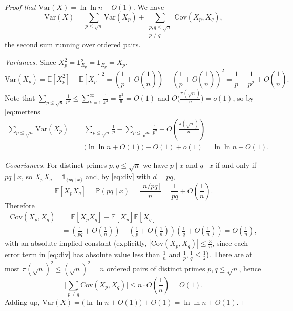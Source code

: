 \documentclass[a4paper,12pt]{article}
\newcommand{\card}[1]{\left| #1 \right|}
\newcommand{\mb}[1]{\mathbb{#1}}
\begin{document}
\begin{proof}[Proof that $\mathrm{Var}(X) = \ln \ln n + O(1)$]
	We have
	\[
		\mathrm{Var}(X) = \sum_{p \le \sqrt n} \mathrm{Var}(X_p) + \sum_{\substack{p, q \le \sqrt n \\ p \neq q}} \mathrm{Cov}(X_p, X_q),
	\]
	the second sum running over ordered pairs.

	\emph{Variances.} Since $X_p^2 = \mathbf 1_{E_p}^2 = \mathbf 1_{E_p} = X_p$,
	\[
		\mathrm{Var}(X_p) = \mb E[X_p^2] - \mb E[X_p]^2 = \left( \frac 1p + O\left( \frac1n \right) \right) - \left( \frac 1p + O\left( \frac1n \right) \right)^2 = \frac 1p - \frac{1}{p^2} + O\left( \frac 1n \right).
	\]
	Note that $\sum_{p \le \sqrt n} \frac{1}{p^2} \le \sum_{k=1}^\infty \frac{1}{k^2} = \frac{\pi^2}{6} = O(1)$ and $O\big( \frac{\pi(\sqrt n)}{n} \big) = o(1)$, so by \eqref{eq:mertens}
	\[
		\begin{aligned}
			\sum_{p \le \sqrt n} \mathrm{Var}(X_p) &= \sum_{p \le \sqrt n} \frac 1p - \sum_{p \le \sqrt n} \frac{1}{p^2} + O\left( \frac{\pi(\sqrt n)}{n} \right) \\
			&= \big( \ln \ln n + O(1) \big) - O(1) + o(1) = \ln \ln n + O(1).
		\end{aligned}
	\]

	\emph{Covariances.} For distinct primes $p, q \le \sqrt n$ we have $p \mid x$ and $q \mid x$ if and only if $pq \mid x$, so $X_p X_q = \mathbf 1_{\{pq \mid x\}}$ and, by \eqref{eq:div} with $d = pq$,
	\[
		\mb E[X_p X_q] = \mb P(pq \mid x) = \frac{\lfloor n/pq \rfloor}{n} = \frac{1}{pq} + O\left( \frac 1n \right).
	\]
	Therefore
	\[
		\begin{aligned}
			\mathrm{Cov}(X_p, X_q) &= \mb E[X_p X_q] - \mb E[X_p] \mb E[X_q] \\
			&= \left( \frac{1}{pq} + O\left( \frac1n \right) \right) - \left( \frac1p + O\left( \frac1n \right) \right) \left( \frac1q + O\left( \frac1n \right) \right) = O\left( \frac1n \right),
		\end{aligned}
	\]
	with an absolute implied constant (explicitly, $\card{\mathrm{Cov}(X_p, X_q)} \le \frac3n$, since each error term in \eqref{eq:div} has absolute value less than $\frac1n$ and $\frac1p, \frac1q \le \frac12$). There are at most $\pi(\sqrt n)^2 \le (\sqrt n)^2 = n$ ordered pairs of distinct primes $p, q \le \sqrt n$, hence
	\[
		\Big| \sum_{p \neq q} \mathrm{Cov}(X_p, X_q) \Big| \le n \cdot O\left( \frac 1n \right) = O(1).
	\]
	Adding up, $\mathrm{Var}(X) = \big( \ln \ln n + O(1) \big) + O(1) = \ln \ln n + O(1)$.
\end{proof}
\end{document}
